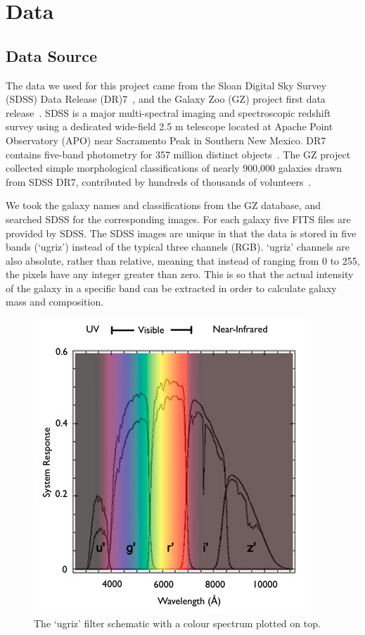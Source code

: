 \section{Data}
\label{sec:data}
\subsection{Data Source}
\label{sec:data_source}
The data we used for this project came from the Sloan Digital Sky Survey (SDSS) Data Release (DR)7~\cite{abazajian2009seventh}, and the Galaxy Zoo (GZ) project first data release~\cite{lintott2010galaxy}. 
SDSS is a major multi-spectral imaging and spectroscopic redshift survey using a dedicated wide-field 2.5 m telescope located at Apache Point Observatory (APO) near Sacramento Peak in Southern New Mexico.
DR7 contains five-band photometry for 357 million distinct objects~\cite{abazajian2009seventh}. 
The GZ project collected simple morphological classifications of nearly 900,000 galaxies drawn from SDSS DR7, contributed by hundreds of thousands of volunteers~\cite{lintott2010galaxy}. 

We took the galaxy names and classifications from the GZ database, and searched SDSS for the corresponding images. For each galaxy five FITS files are provided by SDSS.
The SDSS images are unique in that the data is stored in five bands (`ugriz') instead of the typical three channels (RGB). 
`ugriz' channels are also absolute, rather than relative, meaning that instead of ranging from 0 to 255, the pixels have any integer greater than zero. 
This is so that the actual intensity of the galaxy in a specific band can be extracted in order to calculate galaxy mass and composition.


\begin{figure}[h!]
	\centering
	\captionsetup{justification=centering}
	\includegraphics[scale=0.5]{Figures/filters.jpg}
	\caption{The `ugriz' filter schematic with a colour spectrum plotted on top.}
	\label{fig:filters}
\end{figure}



